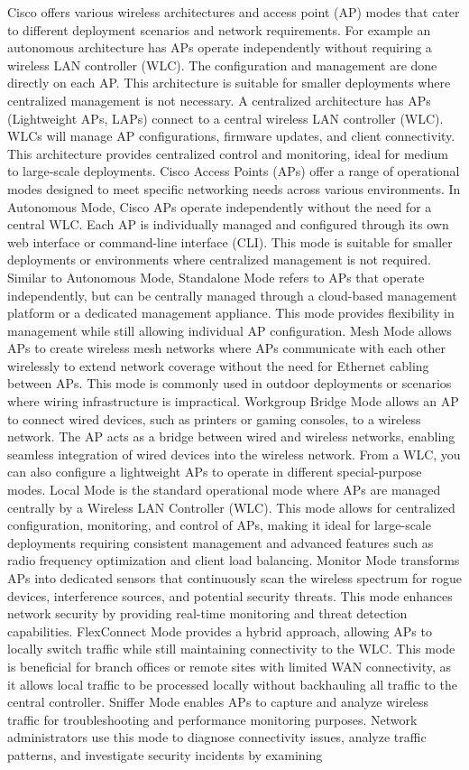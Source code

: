 \documentclass{article}
\begin{document}
	Cisco offers various wireless architectures and access point (AP) modes that cater to different deployment scenarios and network requirements. For example an autonomous architecture has APs operate independently without requiring a wireless LAN controller (WLC). The configuration and management are done directly on each AP. This architecture is suitable for smaller deployments where centralized management is not necessary. A centralized architecture has APs (Lightweight APs, LAPs) connect to a central wireless LAN controller (WLC). WLCs will manage AP configurations, firmware updates, and client connectivity. This architecture provides centralized control and monitoring, ideal for medium to large-scale deployments. Cisco Access Points (APs) offer a range of operational modes designed to meet specific networking needs across various environments. In Autonomous Mode, Cisco APs operate independently without the need for a central WLC. Each AP is individually managed and configured through its own web interface or command-line interface (CLI). This mode is suitable for smaller deployments or environments where centralized management is not required. Similar to Autonomous Mode, Standalone Mode refers to APs that operate independently, but can be centrally managed through a cloud-based management platform or a dedicated management appliance. This mode provides flexibility in management while still allowing individual AP configuration. Mesh Mode allows APs to create wireless mesh networks where APs communicate with each other wirelessly to extend network coverage without the need for Ethernet cabling between APs. This mode is commonly used in outdoor deployments or scenarios where wiring infrastructure is impractical. Workgroup Bridge Mode allows an AP to connect wired devices, such as printers or gaming consoles, to a wireless network. The AP acts as a bridge between wired and wireless networks, enabling seamless integration of wired devices into the wireless network. From a WLC, you can also configure a lightweight APs to operate in different special-purpose modes. Local Mode is the standard operational mode where APs are managed centrally by a Wireless LAN Controller (WLC). This mode allows for centralized configuration, monitoring, and control of APs, making it ideal for large-scale deployments requiring consistent management and advanced features such as radio frequency optimization and client load balancing. Monitor Mode transforms APs into dedicated sensors that continuously scan the wireless spectrum for rogue devices, interference sources, and potential security threats. This mode enhances network security by providing real-time monitoring and threat detection capabilities. FlexConnect Mode provides a hybrid approach, allowing APs to locally switch traffic while still maintaining connectivity to the WLC. This mode is beneficial for branch offices or remote sites with limited WAN connectivity, as it allows local traffic to be processed locally without backhauling all traffic to the central controller. Sniffer Mode enables APs to capture and analyze wireless traffic for troubleshooting and performance monitoring purposes. Network administrators use this mode to diagnose connectivity issues, analyze traffic patterns, and investigate security incidents by examining 
\end{document}
